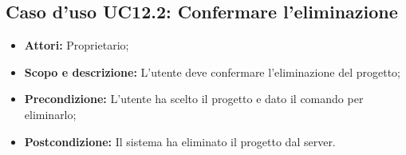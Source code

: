 \subsection{Caso d'uso UC12.2: Confermare l'eliminazione}
\begin{itemize}
	\item \textbf{Attori:} Proprietario;
	\item \textbf{Scopo e descrizione:} L'utente deve confermare l'eliminazione del progetto;
	\item \textbf{Precondizione:} L'utente ha scelto il progetto e dato il comando per eliminarlo;
	\item \textbf{Postcondizione:} Il sistema ha eliminato il progetto dal server.
\end{itemize}